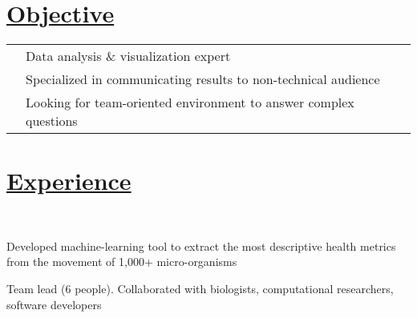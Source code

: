 \documentclass[]{winter-resume-openfont}
\begin{document}
\begin{minipage}[t]{0.65\textwidth}


\section{\underline{Objective}}

\begin{tabular}{lll}
\textbullet{}   & Data analysis \& visualization expert 	\\
\textbullet{}   & Specialized in communicating results to non-technical audience \\
\textbullet{}  & Looking for team-oriented environment to answer complex questions\\
\end{tabular}


\sectionsep

\section{\underline{Experience}}
\sectionsep
{} \\

\sectionsep


\vspace{\topsep}
\begin{tightemize}
\item Developed machine-learning tool to extract the most descriptive health metrics from the movement of 1,000+ micro-organisms
\item Team lead (6 people).  Collaborated with biologists, computational researchers, software developers
\end{tightemize}


\end{minipage}
\end{document}
